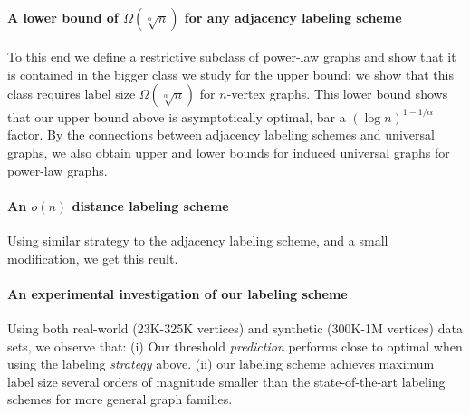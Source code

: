 \paragraph{A lower bound of $\Omega(\sqrt[\alpha]{n})$ for any adjacency labeling scheme}
To this end we define a  restrictive subclass of power-law graphs and show that it is contained in the bigger class we study for the upper bound; we show that this class requires label size $\Omega(\sqrt[\alpha]{n})$ for $n$-vertex graphs.
This lower bound shows that our upper bound above is asymptotically  optimal, bar a $(\log n)^{1 - 1/\alpha}$ factor.
By the connections between adjacency labeling schemes and universal graphs, we also obtain upper and lower bounds for induced universal graphs for power-law graphs. 

\paragraph{An $o(n)$ distance labeling scheme}
Using similar strategy to the adjacency labeling scheme, and a small modification, we get this reult.


\paragraph{An experimental investigation  of our labeling scheme}
Using both real-world (23K-325K vertices) and synthetic (300K-1M vertices) data sets, we observe that:
(i) Our threshold \emph{prediction} performs close to optimal when using the labeling \emph{strategy} above. 
(ii) our labeling scheme achieves maximum label size several orders of magnitude smaller than the state-of-the-art labeling schemes for more general graph families.


